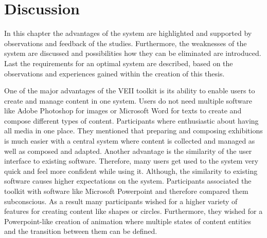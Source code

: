 \chapter{Discussion}
\label{chap:discussion}
In this chapter the advantages of the system are highlighted and supported by observations and feedback of the studies. Furthermore, the weaknesses of the system are discussed and possibilities how they can be eliminated are introduced. Last the requirements for an optimal system are described, based on the observations and experiences gained within the creation of this thesis.

One of the major advantages of the VEII toolkit is its ability to enable users to create and manage content in one system. Users do not need multiple software like Adobe Photoshop for images or Microsoft Word for texts to create and compose different types of content. Participants where enthusiastic about having all media in one place. They mentioned that preparing and composing exhibitions is much easier with a central system where content is collected and managed as well as composed and adapted. 
Another advantage is the similarity of the user interface to existing software. Therefore, many users get used to the system very quick and feel more confident while using it. Although, the similarity to existing software causes higher expectations on the system. Participants associated the toolkit with software like Microsoft Powerpoint and therefore compared them subconscious. As a result many participants wished for a higher variety of features for creating content like shapes or circles. Furthermore, they wished for a Powerpoint-like creation of animation where multiple states of content entities and the transition between them can be defined.
